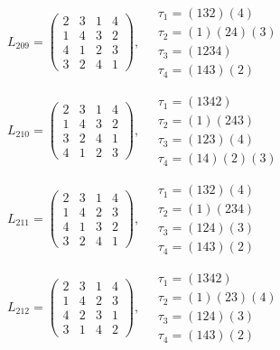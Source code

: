 $L_{209} = \begin{pmatrix} 2 & 3 & 1 & 4 \\ 1 & 4 & 3 & 2 \\ 4 & 1 & 2 & 3 \\ 3 & 2 & 4 & 1 \end{pmatrix}, \quad \begin{matrix} \tau_{1} = (1 3 2)(4) \\ \tau_{2} = (1)(2 4)(3) \\ \tau_{3} = (1 2 3 4) \\ \tau_{4} = (1 4 3)(2) \end{matrix}$

$L_{210} = \begin{pmatrix} 2 & 3 & 1 & 4 \\ 1 & 4 & 3 & 2 \\ 3 & 2 & 4 & 1 \\ 4 & 1 & 2 & 3 \end{pmatrix}, \quad \begin{matrix} \tau_{1} = (1 3 4 2) \\ \tau_{2} = (1)(2 4 3) \\ \tau_{3} = (1 2 3)(4) \\ \tau_{4} = (1 4)(2)(3) \end{matrix}$

$L_{211} = \begin{pmatrix} 2 & 3 & 1 & 4 \\ 1 & 4 & 2 & 3 \\ 4 & 1 & 3 & 2 \\ 3 & 2 & 4 & 1 \end{pmatrix}, \quad \begin{matrix} \tau_{1} = (1 3 2)(4) \\ \tau_{2} = (1)(2 3 4) \\ \tau_{3} = (1 2 4)(3) \\ \tau_{4} = (1 4 3)(2) \end{matrix}$

$L_{212} = \begin{pmatrix} 2 & 3 & 1 & 4 \\ 1 & 4 & 2 & 3 \\ 4 & 2 & 3 & 1 \\ 3 & 1 & 4 & 2 \end{pmatrix}, \quad \begin{matrix} \tau_{1} = (1 3 4 2) \\ \tau_{2} = (1)(2 3)(4) \\ \tau_{3} = (1 2 4)(3) \\ \tau_{4} = (1 4 3)(2) \end{matrix}$

